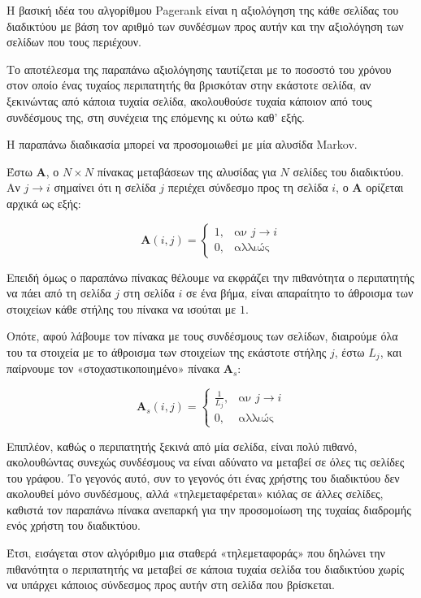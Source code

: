 Η βασική ιδέα του αλγορίθμου Pagerank είναι η αξιολόγηση της κάθε σελίδας του διαδικτύου με βάση τον αριθμό των συνδέσμων προς αυτήν και την αξιολόγηση των σελίδων που τους περιέχουν.

Το αποτέλεσμα της παραπάνω αξιολόγησης ταυτίζεται με το ποσοστό του χρόνου στον οποίο ένας τυχαίος περιπατητής θα βρισκόταν στην εκάστοτε σελίδα, αν ξεκινώντας από κάποια τυχαία σελίδα, ακολουθούσε τυχαία κάποιον από τους συνδέσμους της, στη συνέχεια της επόμενης κι ούτω καθ' εξής.

Η παραπάνω διαδικασία μπορεί να προσομοιωθεί με μία αλυσίδα Markov.

Έστω $\bm{A}$, ο $N\times N$  πίνακας μεταβάσεων της αλυσίδας για $N$ σελίδες του διαδικτύου. Αν  $ j\rightarrow i$ σημαίνει ότι η σελίδα $j$ περιέχει σύνδεσμο προς τη σελίδα $i$, ο $\bm{A}$ ορίζεται αρχικά ως εξής:

\[
  \bm{A}(i, j) = 
  \begin{cases}
    1, & \text{αν } j\rightarrow i \\
    0, & \text{αλλιώς }
  \end{cases}
\]

Επειδή όμως ο παραπάνω πίνακας θέλουμε να εκφράζει την πιθανότητα ο περιπατητής να πάει από τη σελίδα $j$ στη σελίδα $i$ σε ένα βήμα, είναι απαραίτητο το άθροισμα των στοιχείων κάθε στήλης του πίνακα να ισούται με $1$.

Οπότε, αφού λάβουμε τον πίνακα με τους συνδέσμους των σελίδων, διαιρούμε όλα του τα στοιχεία με το άθροισμα των στοιχείων της εκάστοτε στήλης $j$, έστω $L_j$, και παίρνουμε τον «στοχαστικοποιημένο» πίνακα $\bm{A}_s$:

\[
  \bm{A}_s(i, j) = 
  \begin{cases}
    \frac{1}{L_j}, & \text{αν } j\rightarrow i \\
    0, & \text{αλλιώς }
  \end{cases}
\]

Επιπλέον, καθώς ο περιπατητής ξεκινά από μία σελίδα, είναι πολύ πιθανό, ακολουθώντας συνεχώς συνδέσμους να είναι αδύνατο να μεταβεί σε όλες τις σελίδες του γράφου. Το γεγονός αυτό, συν το γεγονός ότι ένας χρήστης του διαδικτύου δεν ακολουθεί μόνο συνδέσμους, αλλά «τηλεμεταφέρεται» κιόλας σε άλλες σελίδες, καθιστά τον παραπάνω πίνακα ανεπαρκή για την προσομοίωση της τυχαίας διαδρομής ενός χρήστη του διαδικτύου.

Έτσι, εισάγεται στον αλγόριθμο μια σταθερά «τηλεμεταφοράς» που δηλώνει την πιθανότητα ο περιπατητής να μεταβεί σε κάποια τυχαία σελίδα του διαδικτύου χωρίς να υπάρχει κάποιος σύνδεσμος προς αυτήν στη σελίδα που βρίσκεται.

